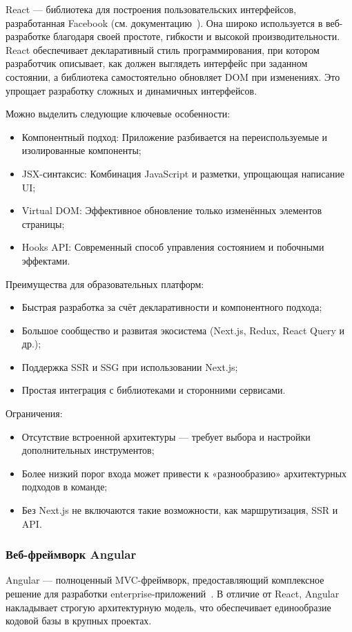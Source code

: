React — библиотека для построения пользовательских интерфейсов, разработанная Facebook (см. документацию~\cite{react_getting_started}). Она широко используется в веб-разработке благодаря своей простоте, гибкости и высокой производительности. React обеспечивает декларативный стиль программирования, при котором разработчик описывает, как должен выглядеть интерфейс при заданном состоянии, а библиотека самостоятельно обновляет DOM при изменениях. Это упрощает разработку сложных и динамичных интерфейсов.

Можно выделить следующие ключевые особенности:
\begin{itemize}
  \item Компонентный подход: Приложение разбивается на переиспользуемые и изолированные компоненты;
  \item JSX-синтаксис: Комбинация JavaScript и разметки, упрощающая написание UI;
  \item Virtual DOM: Эффективное обновление только изменённых элементов страницы;
  \item Hooks API: Современный способ управления состоянием и побочными эффектами.
\end{itemize}

Преимущества для образовательных платформ:
\begin{itemize}
  \item Быстрая разработка за счёт декларативности и компонентного подхода;
  \item Большое сообщество и развитая экосистема (Next.js, Redux, React Query и др.);
  \item Поддержка SSR и SSG при использовании Next.js;
  \item Простая интеграция с библиотеками и сторонними сервисами.
\end{itemize}

Ограничения:
\begin{itemize}
  \item Отсутствие встроенной архитектуры — требует выбора и настройки дополнительных инструментов;
  \item Более низкий порог входа может привести к «разнообразию» архитектурных подходов в команде;
  \item Без Next.js не включаются такие возможности, как маршрутизация, SSR и API.
\end{itemize}

\subsubsection{Веб-фреймворк Angular}
Angular — полноценный MVC-фреймворк, предоставляющий комплексное решение для разработки enterprise-приложений~\cite{angular_overview}. В отличие от React, Angular накладывает строгую архитектурную модель, что обеспечивает единообразие кодовой базы в крупных проектах.

